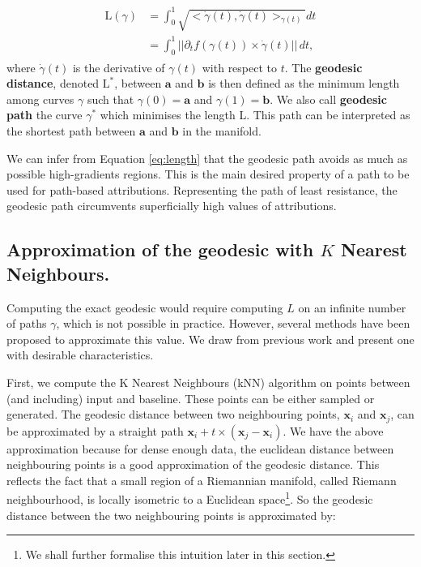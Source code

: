 \begin{align}
\begin{split}
    \textrm{L}(\gamma) &= \int_0^1 \sqrt{<\dot \gamma(t), \dot \gamma(t)>_{\gamma(t)}}dt \\
    &= \int_0^1 ||\partial_t f(\gamma(t)) \times \dot\gamma(t)|| \, dt,
\end{split}
\label{eq:length}
\end{align}
where $\dot\gamma(t)$ is the derivative of $\gamma(t)$ with respect to $t$.
The \textbf{geodesic distance}, denoted $\textrm{L}^*$, between $\textbf{a}$ and $\textbf{b}$ is then defined as the minimum length among curves $\gamma$ such that $\gamma(0) = \textbf{a}$ and $\gamma(1) = \textbf{b}$. We also call \textbf{geodesic path} the curve $\gamma^*$ which minimises the length L. This path can be interpreted as the shortest path between $\textbf{a}$ and $\textbf{b}$ in the manifold. 

\begin{remark}
\label{rem:shortest}
We can infer from Equation \ref{eq:length} that the geodesic path avoids as much as possible high-gradients regions. This is the main desired property of a path to be used for path-based attributions. Representing the path of least resistance, the geodesic path circumvents superficially high values of attributions.
\end{remark}

\subsection{Approximation of the geodesic with $K$ Nearest Neighbours.} Computing the exact geodesic would require computing $L$ on an infinite number of paths $\gamma$, which is not possible in practice. However, several methods have been proposed to approximate this value. We draw from previous work \citep{yang2018geodesic, chen2019fast} and present one with desirable characteristics.

First, we compute the K Nearest Neighbours (kNN) algorithm on points between (and including) input and baseline. These points can be either sampled or generated. The geodesic distance between two neighbouring points, $\textbf{x}_i$ and $\textbf{x}_j$, can be approximated by a straight path $\textbf{x}_i + t \times (\textbf{x}_j - \textbf{x}_i)$. We have the above approximation because for dense enough data, the euclidean distance between neighbouring points is a good approximation of the geodesic distance. This reflects the fact that a small region of a Riemannian manifold, called Riemann neighbourhood, is locally isometric to a Euclidean space\footnote{We shall further formalise this intuition later in this section.}. So the geodesic distance between the two neighbouring points is approximated by: 

